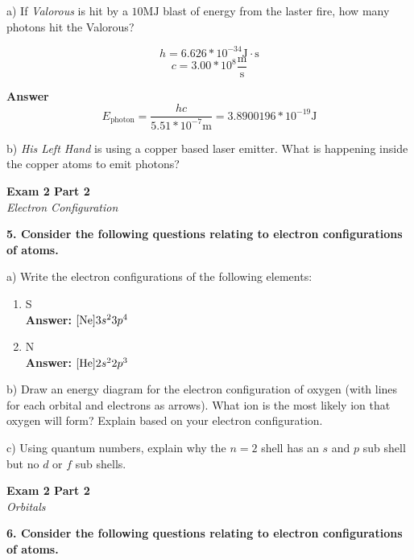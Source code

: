 \documentclass{article}
\begin{document}
    a) If \textit{Valorous} is hit by a $10 \si{\mega\joule}$ blast of energy from the laster fire, how many photons hit the Valorous?

    $$ h = 6.626 * 10^{-34} \si{\joule} \cdot \si{\second}$$
    $$ c = 3.00 * 10^{8} \frac{\si{\meter}}{\si{\second}} $$

    \textbf{Answer}\\
    $$ E_{\text{photon}} = \dfrac{hc}{5.51 * 10^{-7} \si{\meter}} = 3.8900196 * 10^{-19} \si{\joule} $$

    b) \textit{His Left Hand} is using a copper based laser emitter. What is happening inside the copper atoms to emit photons?

    \pagebreak

    \begin{center}
        \textbf{Exam 2 Part 2}\\
        \textit{Electron Configuration}
    \end{center}
    \textbf{5. Consider the following questions relating to electron configurations of atoms.}

    a) Write the electron configurations of the following elements:
    \begin{enumerate}
        \item S\\
        \textbf{Answer: }
        $[\ce{Ne}]3s^{2}3p^{4}$
        \item N\\
        \textbf{Answer: }
        $[\ce{He}]2s^{2}2p^{3}$
    \end{enumerate}

    b) Draw an energy diagram for the electron configuration of oxygen (with lines for each orbital and electrons as arrows). What ion is the most likely ion that oxygen will form? Explain based on your electron configuration.

    c) Using quantum numbers, explain why the $n = 2$ shell has an $s$ and $p$ sub shell but no $d$ or $f$ sub shells.
    \pagebreak

    \begin{center}
        \textbf{Exam 2 Part 2}\\
        \textit{Orbitals}
    \end{center}
    \textbf{6. Consider the following questions relating to electron configurations of atoms.}
\end{document}
